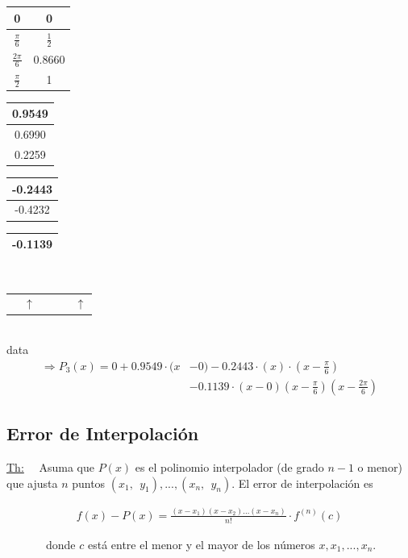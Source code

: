 \begin{tabular}{|c|c|}
\hline 0 & 0\\
\hline
$\displaystyle \frac{\pi}{6}$& $\frac{1}{2}$ \\
\hline
$\displaystyle \frac{2 \pi}{6}$&0.8660 \\
\hline
$ \displaystyle \frac{\pi}{2}$& 1 \\
\hline
\end{tabular}
\hspace*{-0.19cm}
\begin{tabular}{|c|}
\hline
0.9549 \\
\hline
0.6990 \\
\hline
0.2259\\
\hline
\end{tabular}
\hspace*{-0.19cm}
\begin{tabular}{|c|}
\hline
-0.2443 \\
\hline
-0.4232 \\
\hline
\end{tabular}
\hspace*{-0.19cm}
\begin{tabular}{|c|}
\hline
-0.1139 \\
\hline
\end{tabular}\\
\begin{tabular}{cc}
\ \  $\uparrow$ &\ \ \ \ \ $\uparrow$
\end{tabular}\\
\hspace*{0.6cm} data 
\begin{align*}
\Rightarrow P_{3}(x) = 0 + 0.9549 \cdot (x&-0) -0.2443 \cdot (x) \cdot \left(x - \frac{\pi}{6}\right) \\
&-0.1139 \cdot (x-0)\left(x - \frac{\pi}{6}\right)\left(x - \frac{2 \pi}{6}\right)
\end{align*}

\newpage


\subsection{Error de Interpolación}

\underline{Th:} \ \ Asuma que $P(x)$ es el polinomio interpolador (de grado $n-1$ o menor) que ajusta $n$ puntos $(x_{1}, \ \ y_{1}), ..., (x_{n}, \ \ y_{n})$. El error de interpolación es \\
\begin{center}
 \begin{align*}
  f(x) - P(x) = \frac{(x-x_{1})(x-x_{2})...(x-x_{n})}{n!} \cdot f^{(n)}(c)
 \end{align*}
\end{center}
\ \ \ \ \ \ \ donde $c$ está entre el menor y el mayor de los números $x, x_{1}, ... , x_{n}$.\\[2\baselineskip]

